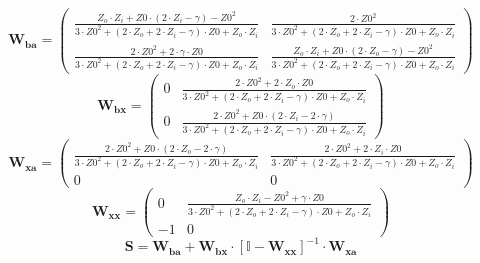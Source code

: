\[ \mathbf{W_{ba}} = \left(\begin{smallmatrix} \frac{Z_o\cdot Z_i+Z0\cdot \left(2\cdot Z_i-\gamma\right)-Z0^2}{3\cdot Z0^2+\left(2\cdot Z_o+2\cdot Z_i-\gamma\right)\cdot Z0+Z_o\cdot Z_i} & \frac{2\cdot Z0^2}{3\cdot Z0^2+\left(2\cdot Z_o+2\cdot Z_i-\gamma\right)\cdot Z0+Z_o\cdot Z_i} \\ \frac{2\cdot Z0^2+2\cdot \gamma\cdot Z0}{3\cdot Z0^2+\left(2\cdot Z_o+2\cdot Z_i-\gamma\right)\cdot Z0+Z_o\cdot Z_i} & \frac{Z_o\cdot Z_i+Z0\cdot \left(2\cdot Z_o-\gamma\right)-Z0^2}{3\cdot Z0^2+\left(2\cdot Z_o+2\cdot Z_i-\gamma\right)\cdot Z0+Z_o\cdot Z_i} \end{smallmatrix}\right) \]
\[ \mathbf{W_{bx}} = \left(\begin{smallmatrix} 0 & \frac{2\cdot Z0^2+2\cdot Z_o\cdot Z0}{3\cdot Z0^2+\left(2\cdot Z_o+2\cdot Z_i-\gamma\right)\cdot Z0+Z_o\cdot Z_i} \\ 0 & \frac{2\cdot Z0^2+Z0\cdot \left(2\cdot Z_i-2\cdot \gamma\right)}{3\cdot Z0^2+\left(2\cdot Z_o+2\cdot Z_i-\gamma\right)\cdot Z0+Z_o\cdot Z_i} \end{smallmatrix}\right) \]
\[ \mathbf{W_{xa}} = \left(\begin{smallmatrix} \frac{2\cdot Z0^2+Z0\cdot \left(2\cdot Z_o-2\cdot \gamma\right)}{3\cdot Z0^2+\left(2\cdot Z_o+2\cdot Z_i-\gamma\right)\cdot Z0+Z_o\cdot Z_i} & \frac{2\cdot Z0^2+2\cdot Z_i\cdot Z0}{3\cdot Z0^2+\left(2\cdot Z_o+2\cdot Z_i-\gamma\right)\cdot Z0+Z_o\cdot Z_i} \\ 0 & 0 \end{smallmatrix}\right) \]
\[ \mathbf{W_{xx}} = \left(\begin{smallmatrix} 0 & \frac{Z_o\cdot Z_i-Z0^2+\gamma\cdot Z0}{3\cdot Z0^2+\left(2\cdot Z_o+2\cdot Z_i-\gamma\right)\cdot Z0+Z_o\cdot Z_i} \\ -1 & 0 \end{smallmatrix}\right) \]
\[ \mathbf{S}=\mathbf{W_{ba}}+\mathbf{W_{bx}}\cdot\left[ \mathbb{I}  -\mathbf{W_{xx}}\right]^{-1}\cdot\mathbf{W_{xa}} \]
